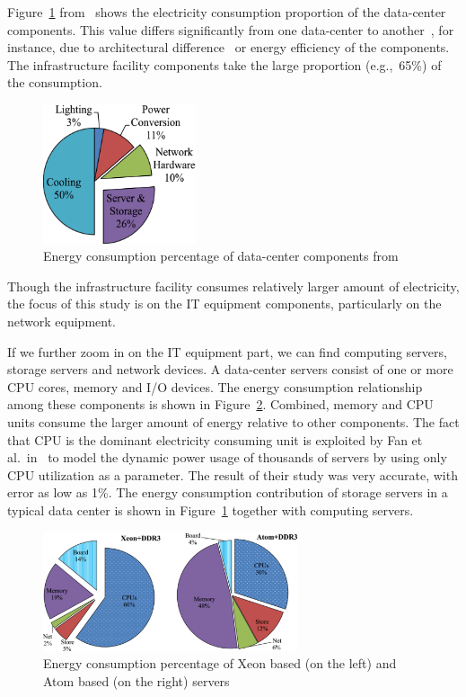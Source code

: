 Figure~\ref{fig:datacenterenergy} from~\cite{DBLP:journals/comsur/DayarathnaWF16} shows the electricity consumption proportion of the data-center components. This value differs significantly from one data-center to another~\cite{DBLP:series/synthesis/2013Barroso}, for instance, due to architectural difference~\cite{DBLP:conf/eenergy/GyarmatiT10} or energy efficiency of the components. The infrastructure facility components take the large proportion (e.g.,~65\%) of the consumption. 
\begin{figure}[ht]
	\begin{center}
		\includegraphics[width=4.5cm]{images/datacenterenergy.pdf}
		\caption{Energy consumption percentage of data-center components from~\cite{DBLP:journals/comsur/DayarathnaWF16}}
		\label{fig:datacenterenergy}
	\end{center}
\end{figure}

Though the infrastructure facility consumes relatively larger amount of electricity, the focus of this study is on the IT equipment components, particularly on the network equipment. 

If we further zoom in on the IT equipment part, we can find computing servers, storage servers and network devices. A data-center servers consist of one or more CPU cores, memory and I/O devices. The energy consumption relationship among these components is shown in Figure~\ref{fig:serverenergy}. Combined, memory and CPU units consume the larger amount of energy relative to other components. The fact that CPU is the dominant electricity consuming unit is exploited by Fan et al.{\ }in~\cite{DBLP:conf/isca/FanWB07} to model the dynamic power usage of thousands of servers by using only CPU utilization as a parameter. The result of their study was very accurate, with error as low as 1\%. The energy consumption contribution of storage servers in a typical data center is shown in Figure~\ref{fig:datacenterenergy} together with computing servers.
\begin{figure}[ht]
	\begin{center}
		\includegraphics[width=7.5cm]{images/serverenergy.pdf}
		\caption{Energy consumption percentage of Xeon based (on the left) and Atom based (on the right) servers \cite{DBLP:journals/comsur/DayarathnaWF16}}
		\label{fig:serverenergy}
	\end{center}
\end{figure}

